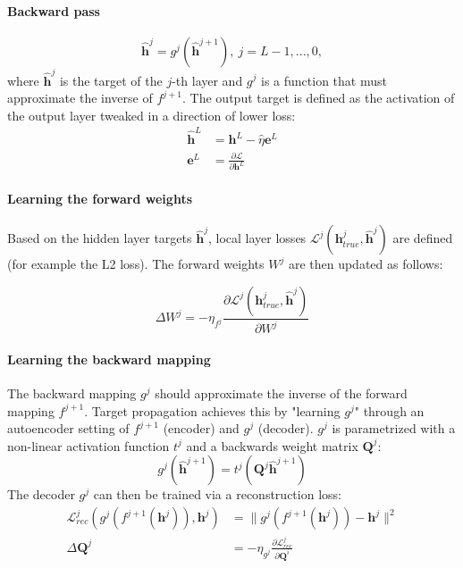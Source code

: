 \documentclass[main]{subfiles}
\begin{document}
\paragraph{Backward pass}
\begin{equation}
	\bm{\hat{h}}^j = g^j(\bm{\hat{h}}^{j+1}),\ j=L-1, ..., 0 ,
\end{equation}
where $\bm{\hat{h}}^j$ is the target of the $j$-th layer and $g^j$ is a function that must approximate the inverse of $f^{j+1}$. The output target is defined as the activation of the output layer tweaked in a direction of lower loss:
\begin{align}
	\bm{\hat{h}}^L &= \bm{h}^L - \hat{\eta}\bm{e}^L\\
	\bm{e}^L &= \frac{\partial \mathcal{L}}{\partial \bm{h}^L}
\end{align}

\paragraph{Learning the forward weights}
Based on the hidden layer targets $\bm{\hat{h}}^j$, local layer losses $\mathcal{L}^j(\bm{h}_{true}^j, \bm{\hat{h}}^j)$ are defined (for example the L2 loss). The forward weights $W^j$ are then updated as follows:

\begin{equation}
    \Delta W^j = -\eta_{f^j} \frac{\partial \mathcal{L}^j(\bm{h}_{true}^j, \bm{\hat{h}}^j)}{\partial W^j}
\end{equation}

\paragraph{Learning the backward mapping}
The backward mapping $g^j$ should approximate the inverse of the forward mapping $f^{j+1}$. Target propagation achieves this by "learning $g^j$" through an autoencoder setting of $f^{j+1}$ (encoder) and $g^j$ (decoder). $g^j$ is parametrized with a non-linear activation function $t^j$ and a backwards weight matrix $\bm{Q}^j$: 
%
\begin{equation}
    g^j(\bm{\hat{h}}^{j+1}) = t^j(\bm{Q}^j\bm{\hat{h}}^{j+1})
\end{equation}
%
The decoder $g^j$ can then be trained via a reconstruction loss:
%
\begin{align}
    \mathcal{L}_{rec}^j(g^j(f^{j+1}(\bm{h}^j)), \bm{h}^j) &= \| g^j(f^{j+1}(\bm{h}^j)) - \bm{h}^j\|^2\\
    \Delta \bm{Q}^j &= -\eta_{g^j} \frac{\partial \mathcal{L}_{rec}^j}{\partial \bm{Q}^i}
\end{align}
\end{document}

